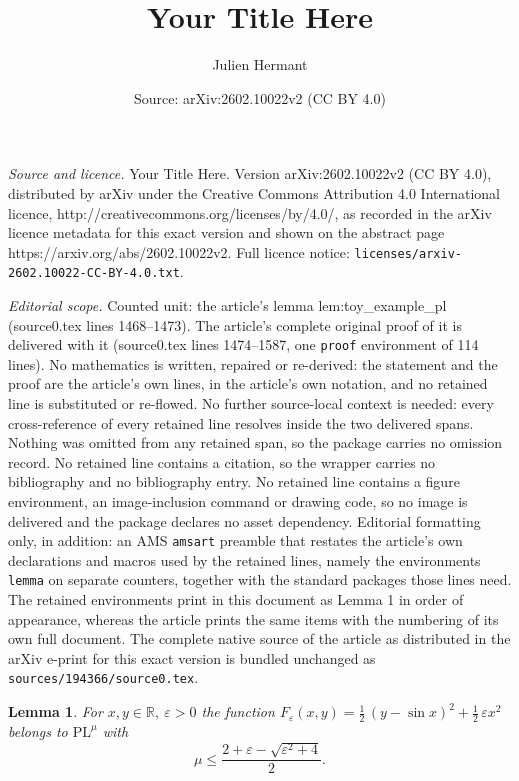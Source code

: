 \documentclass[10pt,a4paper]{amsart}
\title{Your Title Here}
\author{Julien Hermant}
\date{Source: arXiv:2602.10022v2 (CC BY 4.0)}
\newtheorem{lemma}{Lemma}
\def\R{{\mathbb{R}}}
\def\pl{{\text{PL}^\mu}}
\begin{document}
\maketitle

\noindent\emph{Source and licence.} Your Title Here. Version arXiv:2602.10022v2 (CC BY 4.0), distributed by arXiv under the Creative Commons Attribution 4.0 International licence, http://creativecommons.org/licenses/by/4.0/, as recorded in the arXiv licence metadata for this exact version and shown on the abstract page https://arxiv.org/abs/2602.10022v2. Full licence notice: \texttt{licenses/arxiv-2602.10022-CC-BY-4.0.txt}.\par\smallskip

\noindent\textit{Editorial scope.} Counted unit: the article's lemma lem:toy\_example\_pl (source0.tex lines 1468--1473). The article's complete original proof of it is delivered with it (source0.tex lines 1474--1587, one \texttt{proof} environment of 114 lines). No mathematics is written, repaired or re-derived: the statement and the proof are the article's own lines, in the article's own notation, and no retained line is substituted or re-flowed.  No further source-local context is needed: every cross-reference of every retained line resolves inside the two delivered spans.  Nothing was omitted from any retained span, so the package carries no omission record.  No retained line contains a citation, so the wrapper carries no bibliography and no bibliography entry.  No retained line contains a figure environment, an image-inclusion command or drawing code, so no image is delivered and the package declares no asset dependency.  Editorial formatting only, in addition: an AMS \texttt{amsart} preamble that restates the article's own declarations and macros used by the retained lines, namely the environments \texttt{lemma} on separate counters, together with the standard packages those lines need.  The retained environments print in this document as Lemma 1 in order of appearance, whereas the article prints the same items with the numbering of its own full document.  The complete native source of the article as distributed in the arXiv e-print for this exact version is bundled unchanged as \texttt{sources/194366/source0.tex}.
\begin{lemma}\label{lem:toy_example_pl}
    For $x,y\in\R,\ \varepsilon>0$ the function $F_{\varepsilon}(x,y)=\tfrac12\,(y-\sin x)^2+\tfrac12\,\varepsilon x^2$ belongs to $\pl$ with
  $$\mu \le \frac{2+\varepsilon
-\sqrt{\varepsilon^2+4}}{2}.$$

\end{lemma}
\end{document}
